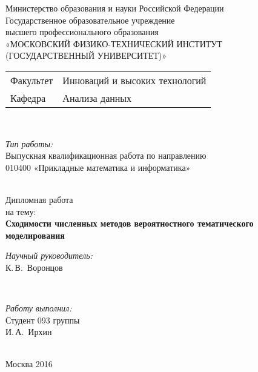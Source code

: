 \documentclass[12pt]{article}
\begin{document}
\begin{titlepage}

\begin{center}

Министерство образования и науки Российской Федерации\\[1em]
Государственное образовательное учреждение\\
высшего профессионального образования \\
«МОСКОВСКИЙ ФИЗИКО-ТЕХНИЧЕСКИЙ ИНСТИТУТ \\
(ГОСУДАРСТВЕННЫЙ УНИВЕРСИТЕТ)»\\[1em]

\begin{minipage}{\textwidth}
\begin{flushleft}
\begin{tabular}{ l l }
Факультет & Инноваций и высоких технологий\\
Кафедра & Анализа данных
\end{tabular}
\end{flushleft}
\end{minipage}\\[1em]

\begin{minipage}{\textwidth}
\begin{flushright}
\textit{Тип работы:}\\
Выпускная квалификационная работа по направлению\\
010400 «Прикладные математика и информатика»
\end{flushright}
\end{minipage}\\[3em]


{Дипломная работа}\\
{на тему:}\\[1em]
\textbf{\large Сходимости численных методов вероятностного тематического моделирования}\\[6em]

\begin{minipage}{\textwidth}
\begin{flushright}
\textit{Научный руководитель:}\\
\underline{\hspace*{2.5cm}} К.\,В.~Воронцов
\end{flushright}
\end{minipage}\\[3em]

\begin{minipage}{\textwidth}
\begin{flushright}
\textit{Работу выполнил:}\\
Студент 093 группы\\
\underline{\hspace*{2.5cm}} И.\,А.~Ирхин
\end{flushright}
\end{minipage}\\[3em]

\vfill
{\normalsize Москва 2016}
\end{center}
\end{titlepage}
\end{document}
